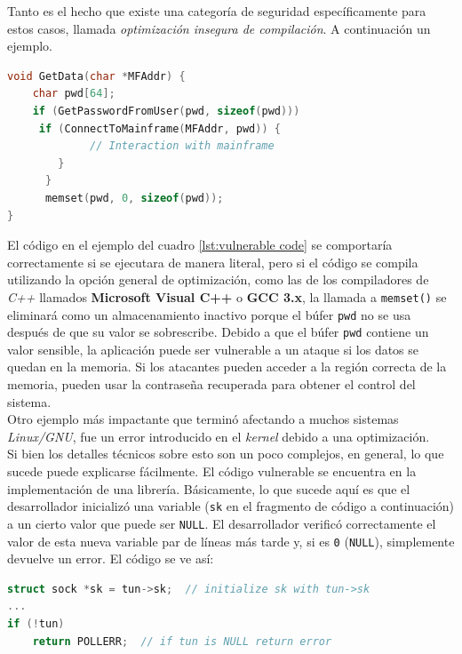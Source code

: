 Tanto es el hecho que existe una categoría de seguridad específicamente para estos casos, llamada \textit{optimización insegura de compilación}. A continuación un ejemplo\cite{insecureoptOWASP}.

\begin{lstlisting}[language={c}, label={lst:vulnerable code}, caption={Código vulnerable}, captionpos={b}, frame={shadowbox}]
void GetData(char *MFAddr) {
    char pwd[64];
    if (GetPasswordFromUser(pwd, sizeof(pwd))) 
     if (ConnectToMainframe(MFAddr, pwd)) {
             // Interaction with mainframe
        }
      }
      memset(pwd, 0, sizeof(pwd));
}
\end{lstlisting}

El código en el ejemplo del cuadro \ref{lst:vulnerable code} se comportaría correctamente si se ejecutara de manera literal, pero si el código se compila utilizando la opción general de optimización, como las de los compiladores de \textit{C++} llamados \textbf{Microsoft Visual C++} o \textbf{GCC 3.x}, la llamada a \texttt{memset()} se eliminará como un almacenamiento inactivo porque el búfer \texttt{pwd} no se usa después de que su valor se sobrescribe. Debido a que el búfer \texttt{pwd} contiene un valor sensible, la aplicación puede ser vulnerable a un ataque si los datos se quedan en la memoria. Si los atacantes pueden acceder a la región correcta de la memoria, pueden usar la contraseña recuperada para obtener el control del sistema.\cite{wikiseicmuedu}\\
 
Otro ejemplo más impactante que terminó afectando a muchos sistemas \textit{Linux/GNU}, fue un error introducido en el \textit{kernel} debido a una optimización.\\

Si bien los detalles técnicos sobre esto son un poco complejos, en general, lo que sucede puede explicarse fácilmente. El código vulnerable se encuentra en la implementación de una librería. Básicamente, lo que sucede aquí es que el desarrollador inicializó una variable (\texttt{sk} en el fragmento de código a continuación) a un cierto valor que puede ser \texttt{NULL}. El desarrollador verificó correctamente el valor de esta nueva variable par de líneas más tarde y, si es \texttt{0} (\texttt{NULL}), simplemente devuelve un error. El código se ve así\cite{iscsansedukernelvuln}:

\begin{lstlisting}[language={c}, label={lst:kernel vuln}, caption={Código vulnerable 2}, captionpos={b}, frame={shadowbox}]
struct sock *sk = tun->sk;  // initialize sk with tun->sk
...
if (!tun)
    return POLLERR;  // if tun is NULL return error
\end{lstlisting}

